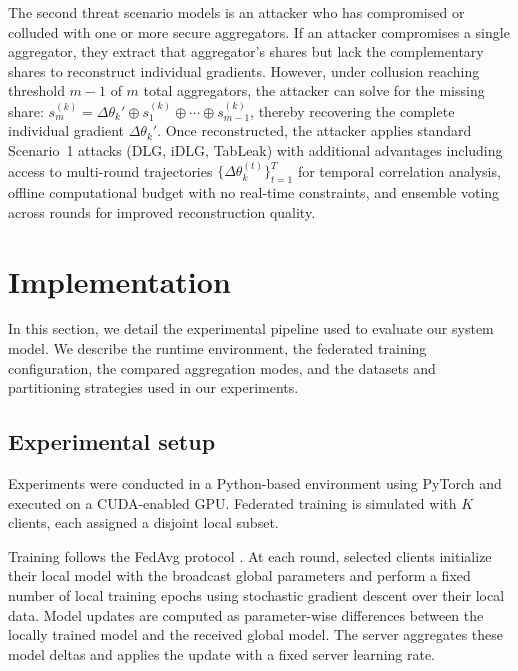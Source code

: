 \documentclass[journal,twoside,web]{ieeecolor}
\begin{document}
The second threat scenario models is an attacker who has compromised or colluded with one or more secure aggregators. If an attacker compromises a single aggregator, they extract that aggregator's shares but lack the complementary shares to reconstruct individual gradients. However, under collusion reaching threshold $m-1$ of $m$ total aggregators, the attacker can solve for the missing share: $s_m^{(k)} = \Delta\theta_k' \oplus s_1^{(k)} \oplus \cdots \oplus s_{m-1}^{(k)}$, thereby recovering the complete individual gradient $\Delta\theta_k'$. Once reconstructed, the attacker applies standard Scenario~1 attacks (DLG, iDLG, TabLeak) with additional advantages including access to multi-round trajectories $\{\Delta\theta_k^{(t)}\}_{t=1}^T$ for temporal correlation analysis, offline computational budget with no real-time constraints, and ensemble voting across rounds for improved reconstruction quality.





\section{Implementation}
In this section, we detail the experimental pipeline used to evaluate our system model. We describe the runtime environment, the federated training configuration, the compared aggregation modes, and the datasets and partitioning strategies used in our experiments.



\subsection{Experimental setup}
\label{sec:experimental_setup}

Experiments were conducted in a Python-based environment using PyTorch and executed on a CUDA-enabled GPU. Federated training is simulated with $K$ clients, each assigned a disjoint local subset.

Training follows the FedAvg protocol \cite{mcmahan2017fedavg}. At each round, selected clients initialize their local model with the broadcast global parameters and perform a fixed number of local training epochs using stochastic gradient descent over their local data. Model updates are computed as parameter-wise differences between the locally trained model and the received global model. The server aggregates these model deltas and applies the update with a fixed server learning rate.
\end{document}
